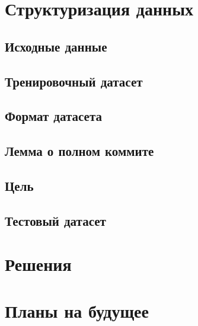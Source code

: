 \documentclass[times]{itmo-student-thesis}
\begin{document}
\section{Структуризация данных}

\subsection{Исходные данные}
\subsection{Тренировочный датасет}
\subsection{Формат датасета}
\subsection{Лемма о полном коммите}
\subsection{Цель}
\subsection{Тестовый датасет}
\section{Решения}
\section{Планы на будущее}

\printmainbibliography
\end{document}
